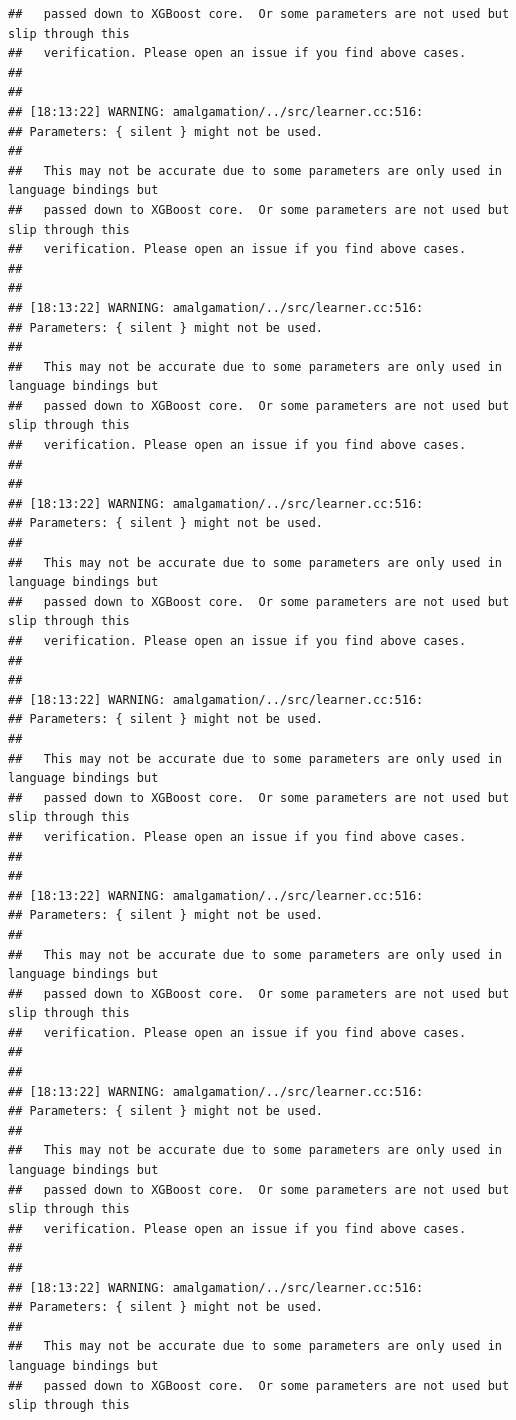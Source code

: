 \documentclass[AMS,STIX2COL]{WileyNJD-v2}\usepackage[]{graphicx}\usepackage[]{color}
\makeatletter
\newenvironment{kframe}{%
 \def\at@end@of@kframe{}%
 \ifinner\ifhmode%
  \def\at@end@of@kframe{\end{minipage}}%
  \begin{minipage}{\columnwidth}%
 \fi\fi%
 \def\FrameCommand##1{\hskip\@totalleftmargin \hskip-\fboxsep
 \colorbox{shadecolor}{##1}\hskip-\fboxsep
     \hskip-\linewidth \hskip-\@totalleftmargin \hskip\columnwidth}%
 \MakeFramed {\advance\hsize-\width
   \@totalleftmargin\z@ \linewidth\hsize
   \@setminipage}}%
 {\par\unskip\endMakeFramed%
 \at@end@of@kframe}
\newenvironment{knitrout}{}{} %
\makeatother
\begin{document}
\begin{knitrout}
\begin{kframe}
\begin{verbatim}
##   passed down to XGBoost core.  Or some parameters are not used but slip through this
##   verification. Please open an issue if you find above cases.
## 
## 
## [18:13:22] WARNING: amalgamation/../src/learner.cc:516: 
## Parameters: { silent } might not be used.
## 
##   This may not be accurate due to some parameters are only used in language bindings but
##   passed down to XGBoost core.  Or some parameters are not used but slip through this
##   verification. Please open an issue if you find above cases.
## 
## 
## [18:13:22] WARNING: amalgamation/../src/learner.cc:516: 
## Parameters: { silent } might not be used.
## 
##   This may not be accurate due to some parameters are only used in language bindings but
##   passed down to XGBoost core.  Or some parameters are not used but slip through this
##   verification. Please open an issue if you find above cases.
## 
## 
## [18:13:22] WARNING: amalgamation/../src/learner.cc:516: 
## Parameters: { silent } might not be used.
## 
##   This may not be accurate due to some parameters are only used in language bindings but
##   passed down to XGBoost core.  Or some parameters are not used but slip through this
##   verification. Please open an issue if you find above cases.
## 
## 
## [18:13:22] WARNING: amalgamation/../src/learner.cc:516: 
## Parameters: { silent } might not be used.
## 
##   This may not be accurate due to some parameters are only used in language bindings but
##   passed down to XGBoost core.  Or some parameters are not used but slip through this
##   verification. Please open an issue if you find above cases.
## 
## 
## [18:13:22] WARNING: amalgamation/../src/learner.cc:516: 
## Parameters: { silent } might not be used.
## 
##   This may not be accurate due to some parameters are only used in language bindings but
##   passed down to XGBoost core.  Or some parameters are not used but slip through this
##   verification. Please open an issue if you find above cases.
## 
## 
## [18:13:22] WARNING: amalgamation/../src/learner.cc:516: 
## Parameters: { silent } might not be used.
## 
##   This may not be accurate due to some parameters are only used in language bindings but
##   passed down to XGBoost core.  Or some parameters are not used but slip through this
##   verification. Please open an issue if you find above cases.
## 
## 
## [18:13:22] WARNING: amalgamation/../src/learner.cc:516: 
## Parameters: { silent } might not be used.
## 
##   This may not be accurate due to some parameters are only used in language bindings but
##   passed down to XGBoost core.  Or some parameters are not used but slip through this

\end{verbatim}
\end{kframe}
\end{knitrout}
\end{document}
